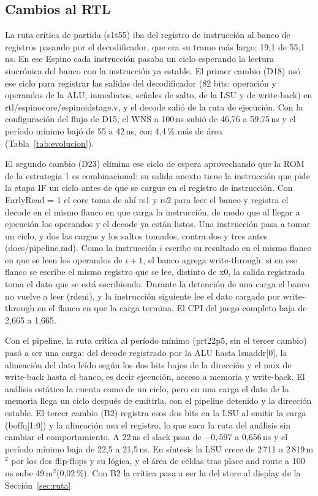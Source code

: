 \documentclass[11pt,a4paper]{article}
\DeclareRobustCommand{\sig}[1]{{\ttfamily\def\_{\textunderscore\allowbreak}#1}}
\newcommand{\umd}{\,\textmu m$^2$\xspace}
\begin{document}
\subsection{Cambios al RTL}
\label{sec:rtl}

La ruta crítica de partida (\sig{s1\_t55}) iba del registro de instrucción al banco de registros pasando por el decodificador, que era su tramo más largo: 19,1 de 55,1\,ns. En ese Espino cada instrucción pasaba un ciclo esperando la lectura sincrónica del banco con la instrucción ya estable. El primer cambio (D18) usó ese ciclo para registrar las salidas del decodificador (82 bits: operación y operandos de la ALU, inmediatos, señales de salto, de la LSU y de write-back) en \sig{rtl/espino\_core/espino\_id\_stage.v}, y el decode salió de la ruta de ejecución. Con la configuración del flujo de D15, el WNS a 100\,ns subió de 46,76 a 59,75\,ns y el período mínimo bajó de 55 a 42\,ns, con 4,4\,\% más de área (Tabla~\ref{tab:evolucion}).

El segundo cambio (D23) elimina ese ciclo de espera aprovechando que la ROM de la estrategia 1 es combinacional: su salida \sig{a\_next\_o} tiene la instrucción que pide la etapa IF un ciclo antes de que se cargue en el registro de instrucción. Con \sig{EarlyRead = 1} el core toma de ahí rs1 y rs2 para leer el banco y registra el decode en el mismo flanco en que carga la instrucción, de modo que al llegar a ejecución los operandos y el decode ya están listos. Una instrucción pasa a tomar un ciclo, y dos las cargas y los saltos tomados, contra dos y tres antes (\sig{docs/pipeline.md}). Como la instrucción $i$ escribe su resultado en el mismo flanco en que se leen los operandos de $i+1$, el banco agrega write-through: si en ese flanco se escribe el mismo registro que se lee, distinto de \sig{x0}, la salida registrada toma el dato que se está escribiendo. Durante la detención de una carga el banco no vuelve a leer (\sig{rd\_en\_i}), y la instrucción siguiente lee el dato cargado por write-through en el flanco en que la carga termina. El CPI del juego completo baja de 2,665 a 1,665.

Con el pipeline, la ruta crítica al período mínimo (\sig{pr\_t22p5}, sin el tercer cambio) pasó a ser una carga: del decode registrado por la ALU hasta \sig{lsu\_addr[0]}, la alineación del dato leído según los dos bits bajos de la dirección y el mux de write-back hasta el banco, es decir ejecución, acceso a memoria y write-back. El análisis estático la cuenta como de un ciclo, pero en una carga el dato de la memoria llega un ciclo después de emitirla, con el pipeline detenido y la dirección estable. El tercer cambio (B2) registra esos dos bits en la LSU al emitir la carga (\sig{boff\_q[1:0]}) y la alineación usa el registro, lo que saca la ruta del análisis sin cambiar el comportamiento. A 22\,ns el slack pasa de $-0{,}597$ a 0,656\,ns y el período mínimo baja de 22,5 a 21,5\,ns. En síntesis la LSU crece de 2\,711 a 2\,819\umd por los dos flip-flops y su lógica, y el área de celdas tras place and route a 100\,ns sube 49\umd (0,02\,\%). Con B2 la crítica pasa a ser la del store al display de la Sección~\ref{sec:ruta}.
\end{document}
